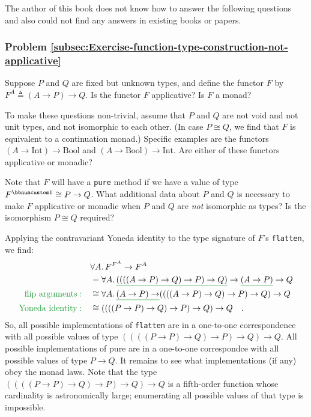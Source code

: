 The author of this book does not know how to answer the following
questions and also could not find any answers in existing books or
papers.

\subsubsection{Problem \label{subsec:Exercise-function-type-construction-not-applicative}\ref{subsec:Exercise-function-type-construction-not-applicative}}

Suppose $P$ and $Q$ are fixed but unknown types, and define the
functor $F$ by $F^{A}\triangleq(A\rightarrow P)\rightarrow Q$. Is
the functor $F$ applicative? Is $F$ a monad?

To make these questions non-trivial, assume that $P$ and $Q$ are
not void and not unit types, and not isomorphic to each other. (In
case $P\cong Q$, we find that $F$ is equivalent to a continuation
monad.) Specific examples are the functors $(A\rightarrow\text{Int})\rightarrow\text{Bool}$
and $(A\rightarrow\text{Bool})\rightarrow\text{Int}$. Are either
of these functors applicative or monadic?

Note that $F$ will have a \lstinline!pure! method if we have a value
of type $F^{\bbnum 1}\cong P\rightarrow Q$. What additional data
about $P$ and $Q$ is necessary to make $F$ applicative or monadic
when $P$ and $Q$ are \emph{not} isomorphic as types? Is the isomorphism
$P\cong Q$ required?

Applying the contravariant Yoneda identity to the type signature of
$F$\textsf{'}s \lstinline!flatten!, we find:
\begin{align*}
 & \forall A.\,F^{F^{A}}\rightarrow F^{A}\\
 & =\forall A.\,\gunderline{((((A\rightarrow P)\rightarrow Q)\rightarrow P)\rightarrow Q)}\rightarrow\gunderline{(A\rightarrow P)}\rightarrow Q\\
{\color{greenunder}\text{flip arguments}:}\quad & \cong\forall A.\,\gunderline{(A\rightarrow P)\rightarrow}((((A\rightarrow P)\rightarrow Q)\rightarrow P)\rightarrow Q)\rightarrow Q\\
{\color{greenunder}\text{Yoneda identity}:}\quad & \cong((((P\rightarrow P)\rightarrow Q)\rightarrow P)\rightarrow Q)\rightarrow Q\quad.
\end{align*}
So, all possible implementations of \lstinline!flatten! are in a
one-to-one correspondence with all possible values of type $((((P\rightarrow P)\rightarrow Q)\rightarrow P)\rightarrow Q)\rightarrow Q$.
All possible implementations of pure are in a one-to-one correspondce
with all possible values of type $P\rightarrow Q$. It remains to
see what implementations (if any) obey the monad laws. Note that the
type $((((P\rightarrow P)\rightarrow Q)\rightarrow P)\rightarrow Q)\rightarrow Q$
is a fifth-order function whose cardinality is astronomically large;
enumerating all possible values of that type is impossible.

